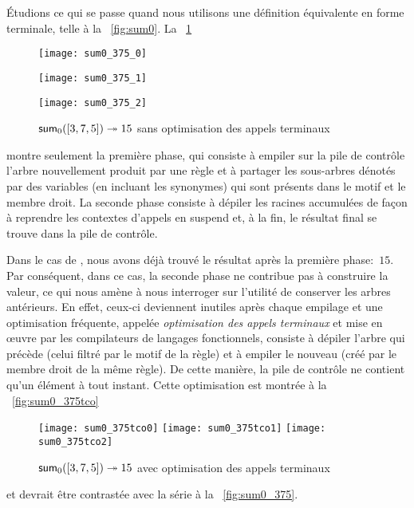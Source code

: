 Étudions ce qui se passe quand nous utilisons une définition
équivalente en forme terminale, telle  à la
\fig~\vref{fig:sum0}. La \fig~\ref{fig:sum0_375}
\begin{figure}[!t]
\centering
\texttt{[image: sum0\_375\_0]}

\texttt{[image: sum0\_375\_1]}

\texttt{[image: sum0\_375\_2]}
\caption{\(\textsf{sum}_0([3,7,5]) \twoheadrightarrow 15\)
  sans optimisation des appels terminaux}
\label{fig:sum0_375}
\end{figure}
montre seulement la première phase, qui consiste à empiler sur la pile
de contrôle l'arbre nouvellement produit par une règle et à partager
les sous-arbres dénotés par des variables (en incluant les synonymes)
qui sont présents dans le motif et le membre droit. La seconde phase
consiste à dépiler les racines accumulées de façon à reprendre les
contextes d'appels en suspend et, à la fin, le résultat final se
trouve dans la pile de contrôle.

Dans le cas de , nous avons déjà trouvé le résultat
après la première phase:~\(15\). Par conséquent, dans ce cas, la
seconde phase ne contribue pas à construire la valeur, ce qui nous
amène à nous interroger sur l'utilité de conserver les arbres
antérieurs. En effet, ceux-ci deviennent inutiles après chaque
empilage et une optimisation fréquente, appelée \emph{optimisation des
  appels terminaux} et mise en œuvre par les compilateurs de
langages fonctionnels, consiste à dépiler l'arbre qui précède (celui
filtré par le motif de la règle) et à empiler le nouveau (créé par le
membre droit de la même règle). De cette manière, la pile de contrôle
ne contient qu'un élément à tout instant. Cette optimisation est
montrée à la \fig~\vref{fig:sum0_375tco}
\begin{figure}[!t]
\centering
\texttt{[image: sum0\_375tco0]}
\texttt{[image: sum0\_375tco1]}
\texttt{[image: sum0\_375tco2]}
\caption{\(\textsf{sum}_0([3,7,5])
  \twoheadrightarrow 15\) avec optimisation des appels terminaux}
\label{fig:sum0_375tco}
\end{figure}
et devrait être contrastée avec la série à la \fig~\vref{fig:sum0_375}.

